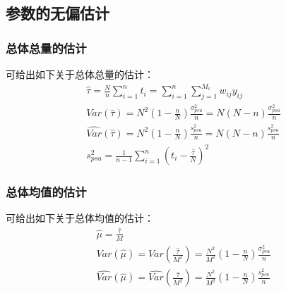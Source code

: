 \subsection{参数的无偏估计}
\subsubsection{总体总量的估计}
可给出如下关于总体总量的估计：
\begin{gather*}
	\hat{\tau}=\frac{N}{n}\sum_{i=1}^nt_i=\sum_{i=1}^{n}\sum_{j=1}^{M_i}w_{ij}y_{ij} \\
	Var(\hat{\tau})=N^2\left(1-\frac{n}{N}\right)\frac{\sigma_{psu}^2}{n}=N(N-n)\frac{\sigma_{psu}^2}{n} \\
	\widehat{Var}(\hat{\tau})=N^2\left(1-\frac{n}{N}\right)\frac{s_{psu}^2}{n}=N(N-n)\frac{s_{psu}^2}{n} \\
	s_{psu}^2=\frac{1}{n-1}\sum_{i=1}^n\left(t_i-\frac{\hat{\tau}}{N}\right)^2
\end{gather*}
\subsubsection{总体均值的估计}
可给出如下关于总体均值的估计：
\begin{gather*}
	\hat{\mu}=\frac{\hat{\tau}}{M} \\
	Var(\hat{\mu})=Var\left(\frac{\hat{\tau}}{M^2}\right)=\frac{N^2}{M^2}\left(1-\frac{n}{N}\right)\frac{\sigma_{psu}^2}{n} \\
	\widehat{Var}(\hat{\mu})=\widehat{Var}\left(\frac{\hat{\tau}}{M^2}\right)=\frac{N^2}{M^2}\left(1-\frac{n}{N}\right)\frac{s_{psu}^2}{n} \\
\end{gather*}

